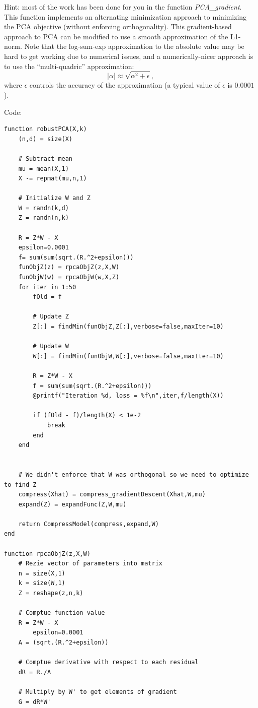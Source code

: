 \documentclass{article}
\begin{document}
Hint: most of the work has been done for you in the function \emph{PCA\_gradient}. This function  implements an alternating minimization approach to minimizing the PCA objective (without enforcing orthogonality). This gradient-based approach to PCA can be modified to use a smooth approximation of the L1-norm. Note that the log-sum-exp approximation to the absolute value may be hard to get working due to numerical issues, and a numerically-nicer approach is to use the ``multi-quadric'' approximation:
\[
|\alpha| \approx \sqrt{\alpha^2 + \epsilon},
\]
where $\epsilon$ controls the accuracy of the approximation (a typical value of $\epsilon$ is $0.0001$).

Code:
\begin{verbatim}
function robustPCA(X,k)
    (n,d) = size(X)

    # Subtract mean
    mu = mean(X,1)
    X -= repmat(mu,n,1)

    # Initialize W and Z
    W = randn(k,d)
    Z = randn(n,k)

    R = Z*W - X
    epsilon=0.0001
    f= sum(sum(sqrt.(R.^2+epsilon)))
    funObjZ(z) = rpcaObjZ(z,X,W)
    funObjW(w) = rpcaObjW(w,X,Z)
    for iter in 1:50
        fOld = f

        # Update Z
        Z[:] = findMin(funObjZ,Z[:],verbose=false,maxIter=10)

        # Update W
        W[:] = findMin(funObjW,W[:],verbose=false,maxIter=10)

        R = Z*W - X
        f = sum(sum(sqrt.(R.^2+epsilon)))
        @printf("Iteration %d, loss = %f\n",iter,f/length(X))

        if (fOld - f)/length(X) < 1e-2
            break
        end
    end


    # We didn't enforce that W was orthogonal so we need to optimize to find Z
    compress(Xhat) = compress_gradientDescent(Xhat,W,mu)
    expand(Z) = expandFunc(Z,W,mu)

    return CompressModel(compress,expand,W)
end

function rpcaObjZ(z,X,W)
    # Rezie vector of parameters into matrix
    n = size(X,1)
    k = size(W,1)
    Z = reshape(z,n,k)

    # Comptue function value
    R = Z*W - X
        epsilon=0.0001
    A = (sqrt.(R.^2+epsilon))

    # Comptue derivative with respect to each residual
    dR = R./A

    # Multiply by W' to get elements of gradient
    G = dR*W'


\end{verbatim}
\end{document}
